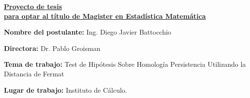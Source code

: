 \begin{center}
    \underline{\textbf{Proyecto de tesis}} \\
    \underline{\textbf{para optar al título de Magister en Estadística Matemática}}
\end{center}

\noindent
\textbf{Nombre del postulante:} Ing. Diego Javier Battocchio

\noindent
\textbf{Directora:} Dr. Pablo Groisman

\noindent
\textbf{Tema de trabajo:} Test de Hipótesis Sobre Homología Persistencia Utilizando la Distancia de Fermat

\noindent
\textbf{Lugar de trabajo:} Instituto de Cálculo.
